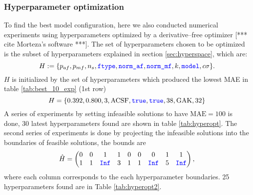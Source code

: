 \documentclass[12pt]{article}
\def\att{                    %
        \marginpar[ \hspace*{\fill} \raisebox{-0.2em}{\rule{2mm}{1.2em}} ]
        {\raisebox{-0.2em}{\rule{2mm}{1.2em}} }
        }
\def\at#1{[*** \att #1 ***]}  %
\begin{document}
\subsubsection{Hyperparameter optimization}
To find the best model configuration, here we also conducted numerical experiments using hyperparameters optimized by a derivative--free optimizer \at{cite Morteza's software}. The set of hyperparameters chosen to be optimized is the subset of hyperparameters explained in section \ref{sec:hyperspace}, which are:
\begin{equation*}
	H := \{p_{af}, p_{mf}, n_s, \codeword{ftype}, \codeword{norm_af}, \codeword{norm_mf}, k, \codeword{model}, c\sigma\}.
\end{equation*}
$H$ is initialized by the set of hyperparameters which produced the lowest MAE in table \ref{tab:best_10_exp} (1st row)
\begin{equation*}
	H = \{0.392, 0.800, 3, \text{ACSF}, \codeword{true}, \codeword{true}, 38, \text{GAK}, 32\}
\end{equation*}
A series of experiments by setting infeasible solutions to have $\text{MAE} = 100$ is done, 30 latest hyperparameters found are shown in table \ref{tab:hyperopt}.
The second series of experiments is done by projecting the infeasible solutions into the boundaries of feasible solutions, the bounds are
\begin{equation*}
	\hat{H} =
	\begin{pmatrix}
		0 & 0 & 1  & 1  & 0  & 0 &  0  & 1 &  1 \\
		1 & 1 & \codeword{Inf} & 3  & 1  & 1 &  \codeword{Inf}& 5 &  \codeword{Inf}
	\end{pmatrix},
\end{equation*}
where each column corresponds to the each hyperparameter boundaries. 25 hyperparameters found are in Table \ref{tab:hyperopt2}.
\end{document}
